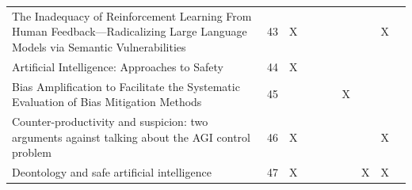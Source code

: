 \begin{landscape}
\begin{longtable}{|p{17cm}|c|c|c|c|c|c|c|c|c|}
		The Inadequacy of Reinforcement Learning From Human Feedback—Radicalizing Large Language Models via Semantic Vulnerabilities                            & 43          & X                                  &                                                           &                                                       &                                                            &                                           &                                              & X                                                  &                                    \\
		Artificial Intelligence: Approaches to Safety                                                                                                           & 44          & X                                  &                                                           &                                                       &                                                            &                                           &                                              &                                                    &                                    \\
		Bias Amplification to Facilitate the Systematic Evaluation of Bias Mitigation Methods                                                                   & 45          &                                    &                                                           &                                                       &                                                            & X                                         &                                              &                                                    &                                    \\
		Counter-productivity and suspicion: two arguments against talking about the AGI control problem                                                         & 46          & X                                  &                                                           &                                                       &                                                            &                                           &                                              & X                                                  &                                    \\
		Deontology and safe artificial intelligence                                                                                                             & 47          & X                                  &                                                           &                                                       &                                                            &                                           & X                                            & X                                                  &                                    \\

\end{longtable}
\end{landscape}
